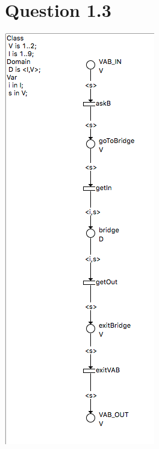 \documentclass[a4paper, 11pt]{article}
\begin{document}
\section{Question 1.3}
\includegraphics[scale=0.35]{VAB.png}
\end{document}
